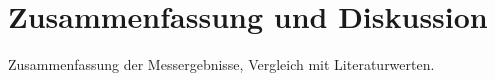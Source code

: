 \section{Zusammenfassung und Diskussion}

Zusammenfassung der Messergebnisse, Vergleich mit Literaturwerten.